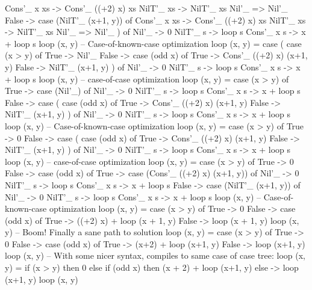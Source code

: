 \begin{spec}
                      Cons'_ x xs -> Cons'_ ((+2) x) xs
                      NilT'_ xs -> NilT'_ xs
                      Nil'_ => Nil'_
                    False -> case (NilT'_ (x+1, y)) of
                      Cons'_ x xs -> Cons'_ ((+2) x) xs
                      NilT'_ xs -> NilT'_ xs
                      Nil'_ => Nil'_
              ) of
                Nil'_ -> 0
                NilT'_ s -> loop s
                Cons'_ x s -> x + loop s
loop (x, y)
-- Case-of-known-case optimization
loop (x, y) = case (
                case (x > y) of
                  True -> Nil'_
                  False ->  case (odd x) of
                    True -> Cons'_ ((+2) x) (x+1, y)
                    False -> NilT'_ (x+1, y)
              ) of
                Nil'_ -> 0
                NilT'_ s -> loop s
                Cons'_ x s -> x + loop s
loop (x, y)
-- case-of-case optimization
loop (x, y) = case (x > y) of
                True -> case (Nil'_) of
                  Nil'_ -> 0
                  NilT'_ s -> loop s
                  Cons'_ x s -> x + loop s
                False -> case (
                  case (odd x) of
                    True -> Cons'_ ((+2) x) (x+1, y)
                    False -> NilT'_ (x+1, y)
                ) of
                  Nil'_ -> 0
                  NilT'_ s -> loop s
                  Cons'_ x s -> x + loop s
loop (x, y)
-- Case-of-known-case optimization
loop (x, y) = case (x > y) of
                True -> 0
                False -> case (
                  case (odd x) of
                    True -> Cons'_ ((+2) x) (x+1, y)
                    False -> NilT'_ (x+1, y)
                ) of
                  Nil'_ -> 0
                  NilT'_ s -> loop s
                  Cons'_ x s -> x + loop s
loop (x, y)
-- case-of-case optimization
loop (x, y) = case (x > y) of
                True -> 0
                False -> case (odd x) of
                  True -> case (Cons'_ ((+2) x) (x+1, y)) of
                    Nil'_ -> 0
                    NilT'_ s -> loop s
                    Cons'_ x s -> x + loop s
                  False -> case (NilT'_ (x+1, y)) of
                    Nil'_ -> 0
                    NilT'_ s -> loop s
                    Cons'_ x s -> x + loop s
loop (x, y)
-- Case-of-known-case optimization
loop (x, y) = case (x > y) of
                True -> 0
                False -> case (odd x) of
                  True -> ((+2) x) + loop (x + 1, y)
                  False -> loop (x + 1, y)
loop (x, y)
-- Boom! Finally a sane path to solution
loop (x, y) = case (x > y) of
                True -> 0
                False -> case (odd x) of
                  True -> (x+2) + loop (x+1, y)
                  False -> loop (x+1, y)
loop (x, y)
-- With some nicer syntax, compiles to same case of case tree:
loop (x, y) = if (x > y)
              then 0
              else if (odd x)
                   then (x + 2) + loop (x+1, y)
                   else -> loop (x+1, y)
loop (x, y)
\end{spec}
